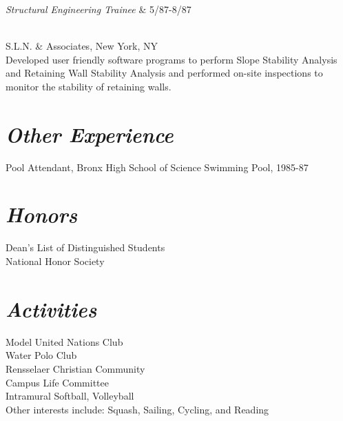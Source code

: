 \documentclass[line,margin]{res}
\begin{document}
{\begin{resume}
\begin{ncolumn}{2}
{\it Structural Engineering Trainee} & 5/87-8/87
\end{ncolumn}\\  
S.L.N. \& Associates, New York, NY \\
Developed  user  friendly  software  programs  to  perform  Slope 
Stability Analysis and  Retaining  Wall  Stability  Analysis  and 
performed   on-site  inspections  to  monitor  the  stability  of 
retaining walls. 
 
\section{\sl  Other Experience}
Pool Attendant, Bronx  High  School  of  Science  Swimming  Pool, 
1985-87 

\section{\sl  Honors}
Dean's List of Distinguished Students \\
National Honor Society 
 
\section{\sl  Activities}
Model United Nations Club \\
Water Polo Club \\
Rensselaer Christian Community \\
Campus Life Committee \\
Intramural Softball, Volleyball \\
Other interests include: Squash, Sailing, Cycling, and Reading 


\end{resume}

\vfill} %
\end{document}
